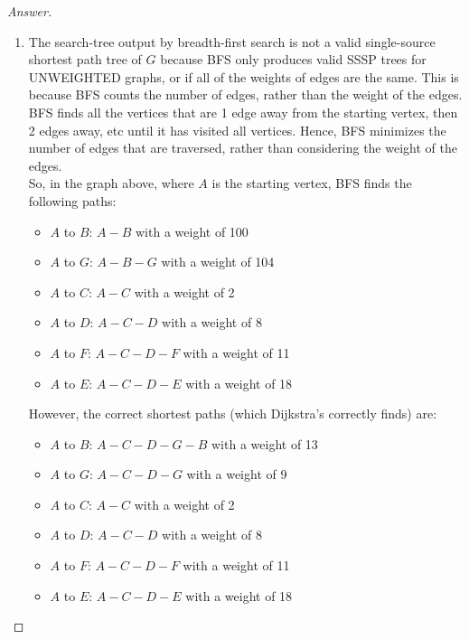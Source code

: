 \documentclass[11pt]{article}
\theoremstyle{definition}
\theoremstyle{definition}
\theoremstyle{definition}
\begin{document}
\begin{proof}[Answer]
\begin{enumerate}[label=(\alph*)]
		\item The search-tree output by breadth-first search is not a valid single-source shortest path tree of $G$ because BFS only produces valid SSSP trees for UNWEIGHTED graphs, or if all of the weights of edges are the same. This is because BFS counts the number of edges, rather than the weight of the edges. BFS finds all the vertices that are 1 edge away from the starting vertex, then 2 edges away, etc until it has visited all vertices. Hence, BFS minimizes the number of edges that are traversed, rather than considering the weight of the edges. \\
So, in the graph above, where $A$ is the starting vertex, BFS finds the following paths: \\
\begin{itemize}
\item $A$ to $B$: $A-B$ with a weight of 100 \\
\item $A$ to $G$: $A-B-G$ with a weight of 104 \\
\item $A$ to $C$: $A-C$ with a weight of 2 \\
\item $A$ to $D$: $A-C-D$ with a weight of 8 \\
\item $A$ to $F$: $A-C-D-F$ with a weight of 11 \\
\item $A$ to $E$: $A-C-D-E$ with a weight of 18 
\end{itemize}
However, the correct shortest paths (which Dijkstra's correctly finds) are:
\begin{itemize}
\item $A$ to $B$: $A-C-D-G-B$ with a weight of 13\\
\item $A$ to $G$: $A-C-D-G$ with a weight of 9 \\
\item $A$ to $C$: $A-C$ with a weight of 2 \\
\item $A$ to $D$: $A-C-D$ with a weight of 8 \\
\item $A$ to $F$: $A-C-D-F$ with a weight of 11 \\
\item $A$ to $E$: $A-C-D-E$ with a weight of 18 
\end{itemize}

	\end{enumerate}


\end{proof}
\end{document}
